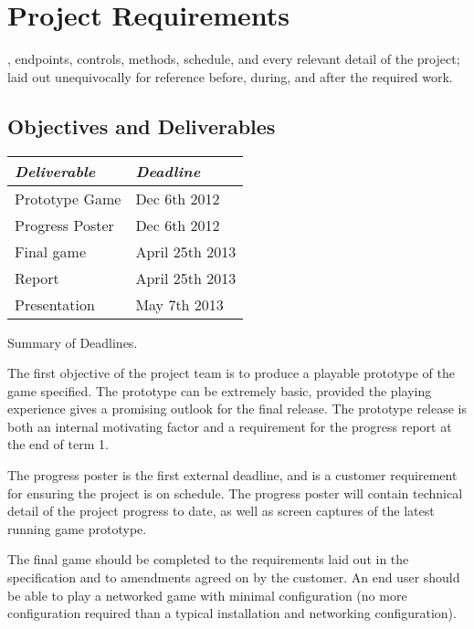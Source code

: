 \chapter[Project Requirements]{Project Requirements}
\label{ch:reference}


, endpoints, controls, methods, schedule, and every relevant detail of the project; laid out unequivocally for reference before, during, and after the required work.

\section{Objectives and Deliverables}

\begin{margintable}
\vspace{12em}
\renewcommand{\arraystretch}{1.5}
\begin{tabular}
{p{8em} p{7em}}
		\toprule
		\emph{Deliverable} & \emph{Deadline} \\
		\midrule
		Prototype Game & Dec 6th 2012\\
		Progress Poster & Dec 6th 2012\\
		Final game & April 25th 2013\\
		Report & April 25th 2013\\
		Presentation & May 7th 2013 \\
		\bottomrule
\end{tabular}
\vspace{0.5em}
\caption{Summary of Deadlines.}
\end{margintable}

The first objective of the project team is to produce a playable prototype of the game specified. 
The prototype can be extremely basic, provided the playing experience gives a promising outlook for the final release. The prototype release is both an internal motivating factor and a requirement for the progress report at the end of term 1.

The progress poster is the first external deadline, and is a customer requirement for ensuring the project is on schedule. The progress poster will contain technical detail of the project progress to date, as well as screen captures of the latest running game prototype.

The final game should be completed to the requirements laid out in the specification and to amendments agreed on by the customer. An end user should be able to play a networked game with minimal configuration (no more configuration required than a typical installation and networking configuration).

